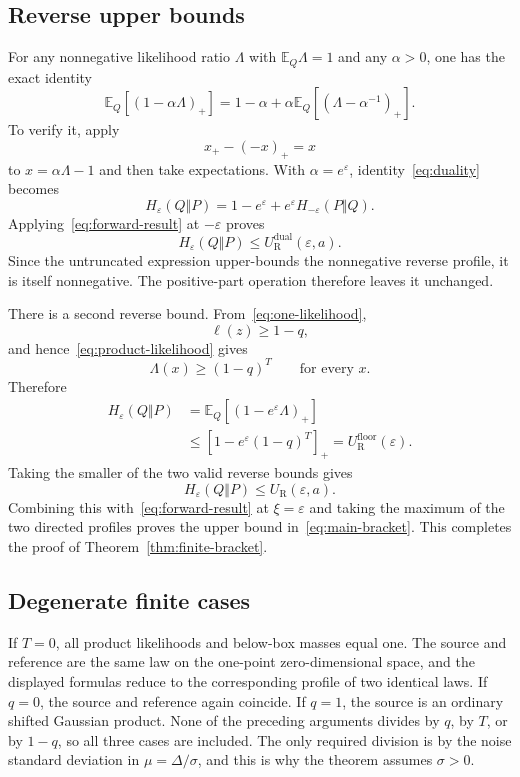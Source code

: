 \documentclass[11pt]{article}
\theoremstyle{remark}
\newcommand{\E}{\mathbb E}
\newcommand{\pos}[1]{\left[#1\right]_{+}}
\begin{document}
\subsection{Reverse upper bounds}

For any nonnegative likelihood ratio $\Lambda$ with $\E_Q\Lambda=1$ and any
$\alpha>0$, one has the exact identity
\begin{equation}\label{eq:duality}
  \E_Q[(1-\alpha\Lambda)_+]
  =1-\alpha+\alpha\E_Q[(\Lambda-\alpha^{-1})_+].
\end{equation}
To verify it, apply
\[
  x_+-(-x)_+=x
\]
to $x=\alpha\Lambda-1$ and then take expectations.  With
$\alpha=e^\varepsilon$, identity~\eqref{eq:duality} becomes
\begin{equation}\label{eq:profile-duality}
  H_\varepsilon(Q\Vert P)
  =1-e^\varepsilon
    +e^\varepsilon H_{-\varepsilon}(P\Vert Q).
\end{equation}
Applying~\eqref{eq:forward-result} at $-\varepsilon$ proves
\[
  H_\varepsilon(Q\Vert P)
  \leq U_{\mathrm R}^{\mathrm{dual}}(\varepsilon,a).
\]
Since the untruncated expression upper-bounds the nonnegative reverse profile,
it is itself nonnegative.  The positive-part operation therefore leaves it
unchanged.

There is a second reverse bound.  From~\eqref{eq:one-likelihood},
\[
  \ell(z)\geq1-q,
\]
and hence~\eqref{eq:product-likelihood} gives
\[
  \Lambda(x)\geq(1-q)^T
  \qquad\text{for every }x.
\]
Therefore
\begin{align*}
  H_\varepsilon(Q\Vert P)
  &=\E_Q[(1-e^\varepsilon\Lambda)_+]\\
  &\leq\pos{1-e^\varepsilon(1-q)^T}
   =U_{\mathrm R}^{\mathrm{floor}}(\varepsilon).
\end{align*}
Taking the smaller of the two valid reverse bounds gives
\[
  H_\varepsilon(Q\Vert P)
  \leq U_{\mathrm R}(\varepsilon,a).
\]
Combining this with~\eqref{eq:forward-result} at $\xi=\varepsilon$ and taking
the maximum of the two directed profiles proves the upper bound
in~\eqref{eq:main-bracket}.  This completes the proof of
Theorem~\ref{thm:finite-bracket}.

\subsection{Degenerate finite cases}

If $T=0$, all product likelihoods and below-box masses equal one.  The source
and reference are the same law on the one-point zero-dimensional space, and
the displayed formulas reduce to the corresponding profile of two identical
laws.  If $q=0$, the source and reference again coincide.  If $q=1$, the
source is an ordinary shifted Gaussian product.  None of the preceding
arguments divides by $q$, by $T$, or by $1-q$, so all three cases are included.
The only required division is by the noise standard deviation in
$\mu=\Delta/\sigma$, and this is why the theorem assumes $\sigma>0$.
\end{document}
